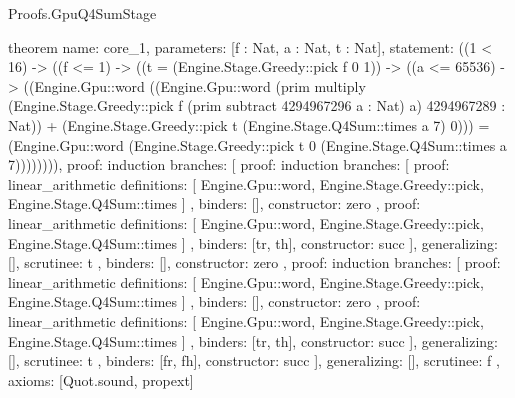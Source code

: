 \begin{lexlean}{Proofs.GpuQ4SumStage}
\begin{semanticmodule}
theorem{
  name: core_1,
  parameters: [f : Nat, a : Nat, t : Nat],
  statement: ((1 < 16) -> ((f <= 1) -> ((t = (Engine.Stage.Greedy::pick f 0 1)) -> ((a <= 65536) -> ((Engine.Gpu::word ((Engine.Gpu::word (prim multiply (Engine.Stage.Greedy::pick f (prim subtract 4294967296 a : Nat) a) 4294967289 : Nat)) + (Engine.Stage.Greedy::pick t (Engine.Stage.Q4Sum::times a 7) 0))) = (Engine.Gpu::word (Engine.Stage.Greedy::pick t 0 (Engine.Stage.Q4Sum::times a 7)))))))),
  proof: induction{
    branches: [
      {
        proof: induction{
          branches: [
            {
              proof: linear_arithmetic{
                definitions: [
                  Engine.Gpu::word,
                  Engine.Stage.Greedy::pick,
                  Engine.Stage.Q4Sum::times
                ]
              },
              binders: [],
              constructor: zero
            },
            {
              proof: linear_arithmetic{
                definitions: [
                  Engine.Gpu::word,
                  Engine.Stage.Greedy::pick,
                  Engine.Stage.Q4Sum::times
                ]
              },
              binders: [tr, th],
              constructor: succ
            }
          ],
          generalizing: [],
          scrutinee: t
        },
        binders: [],
        constructor: zero
      },
      {
        proof: induction{
          branches: [
            {
              proof: linear_arithmetic{
                definitions: [
                  Engine.Gpu::word,
                  Engine.Stage.Greedy::pick,
                  Engine.Stage.Q4Sum::times
                ]
              },
              binders: [],
              constructor: zero
            },
            {
              proof: linear_arithmetic{
                definitions: [
                  Engine.Gpu::word,
                  Engine.Stage.Greedy::pick,
                  Engine.Stage.Q4Sum::times
                ]
              },
              binders: [tr, th],
              constructor: succ
            }
          ],
          generalizing: [],
          scrutinee: t
        },
        binders: [fr, fh],
        constructor: succ
      }
    ],
    generalizing: [],
    scrutinee: f
  },
  axioms: [Quot.sound, propext]
}


\end{semanticmodule}
\end{lexlean}
